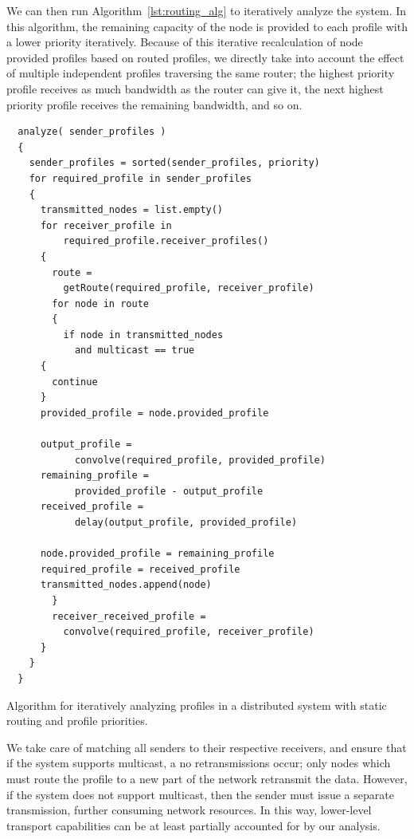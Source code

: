 We can then run Algorithm~\ref{lst:routing_alg} to iteratively analyze
the system.  In this algorithm, the remaining capacity of the node is
provided to each profile with a lower priority iteratively.  Because
of this iterative recalculation of node provided profiles based on
routed profiles, we directly take into account the effect of multiple
independent profiles traversing the same router; the highest priority
profile receives as much bandwidth as the router can give it, the next
highest priority profile receives the remaining bandwidth, and so on.

\begin{listing}[ht!]
  \begin{verbatim}
  analyze( sender_profiles )
  {
    sender_profiles = sorted(sender_profiles, priority)
    for required_profile in sender_profiles
    {
      transmitted_nodes = list.empty() 
      for receiver_profile in
          required_profile.receiver_profiles()
      {
        route =
          getRoute(required_profile, receiver_profile)
        for node in route
        {
          if node in transmitted_nodes
            and multicast == true
	  {
	    continue
	  }
	  provided_profile = node.provided_profile
            
	  output_profile =
            convolve(required_profile, provided_profile)
	  remaining_profile =
            provided_profile - output_profile
	  received_profile =
            delay(output_profile, provided_profile)
            
	  node.provided_profile = remaining_profile
	  required_profile = received_profile
	  transmitted_nodes.append(node)
        }
        receiver_received_profile =
          convolve(required_profile, receiver_profile)
      }
    }
  }
  \end{verbatim}
  \caption{Algorithm for iteratively analyzing profiles in a
    distributed system with static routing and profile priorities.}
  \label{lst:routing_alg}
\end{listing}

We take care of matching all senders to their respective receivers,
and ensure that if the system supports multicast, a no retransmissions
occur; only nodes which must route the profile to a new part of the
network retransmit the data.  However, if the system does not support
multicast, then the sender must issue a separate transmission, further
consuming network resources.  In this way, lower-level transport
capabilities can be at least partially accounted for by our analysis.

